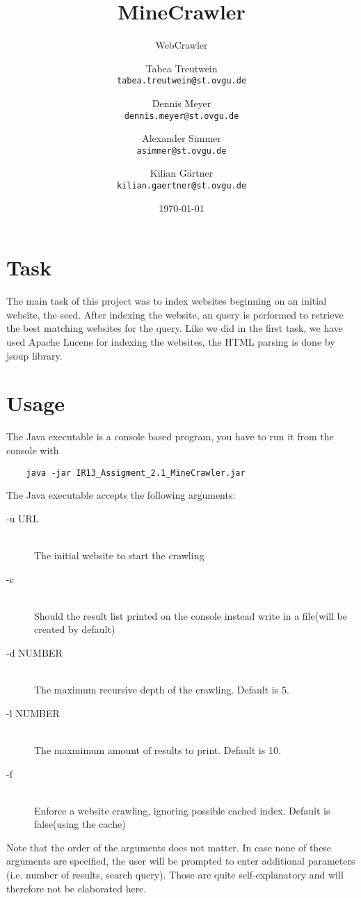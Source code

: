 \documentclass{scrartcl}
\title{MineCrawler}
\subtitle{WebCrawler}
\author{
  Tabea Treutwein\\
  \texttt{tabea.treutwein@st.ovgu.de}\\
  \and
  Dennis Meyer\\
  \texttt{dennis.meyer@st.ovgu.de}\\
  \and
  Alexander Simmer\\
  \texttt{asimmer@st.ovgu.de}\\
  \and
  Kilian Gärtner\\
  \texttt{kilian.gaertner@st.ovgu.de}\\
}
\date{\today}
\begin{document}
\maketitle
 
\section{Task}
The main task of this project was to index websites beginning on an initial website, the seed. After indexing the website, an query is performed to retrieve the best matching websites for the query. Like we did in the first task, we have used Apache Lucene for indexing the websites, the HTML parsing is done by jsoup library.

\section{Usage}

The Java executable is a console based program, you have to run it from the console with
\begin{verbatim}
	java -jar IR13_Assigment_2.1_MineCrawler.jar
\end{verbatim}
The Java executable accepts the following arguments:

\begin{description}
  \item[-u URL] \hfill \\
  The initial website to start the crawling
  \item[-c] \hfill \\
  Should the result list printed on the console instead write in a file(will be created by default)
  \item[-d NUMBER] \hfill \\
  The maximum recursive depth of the crawling. Default is 5.
  \item[-l NUMBER] \hfill \\
  The maxmimum amount of results to print. Default is 10.
  \item[-f] \hfill \\
  Enforce a website crawling, ignoring possible cached index. Default is false(using the cache)
\end{description}
Note that the order of the arguments does not matter. In case none of these arguments are specified, the user will be prompted to enter additional parameters (i.e. number of results, search query). Those are quite self-explanatory and will therefore not be elaborated here.
\end{document}
